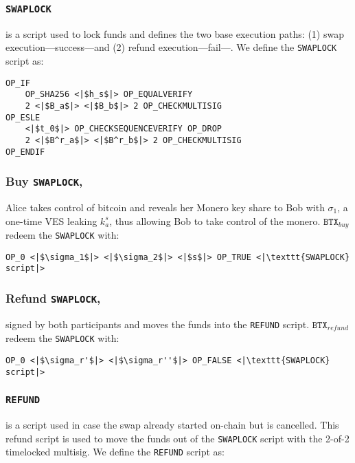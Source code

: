 \documentclass{llncs}
\newcommand{\BTX}{\texttt{BTX}}
\begin{document}
\subsubsection{\texttt{SWAPLOCK}}
is a script used to lock funds and defines the two base execution paths: (1) swap execution---success---and (2) refund execution---fail---. We define the \texttt{SWAPLOCK} script as:

\begin{verbatim}
OP_IF
    OP_SHA256 <|$h_s$|> OP_EQUALVERIFY
    2 <|$B_a$|> <|$B_b$|> 2 OP_CHECKMULTISIG
OP_ESLE
    <|$t_0$|> OP_CHECKSEQUENCEVERIFY OP_DROP
    2 <|$B^r_a$|> <|$B^r_b$|> 2 OP_CHECKMULTISIG
OP_ENDIF
\end{verbatim}

\subsubsection{Buy \texttt{SWAPLOCK},}
Alice takes control of bitcoin and reveals her Monero key share to Bob with $\sigma_1$, a one-time VES leaking $k^s_a$, thus allowing Bob to take control of the monero. $\BTX_\textit{buy}$ redeem the \texttt{SWAPLOCK} with:

\begin{verbatim}
OP_0 <|$\sigma_1$|> <|$\sigma_2$|> <|$s$|> OP_TRUE <|\texttt{SWAPLOCK} script|>
\end{verbatim}

\subsubsection{Refund \texttt{SWAPLOCK},}
signed by both participants and moves the funds into the \texttt{REFUND} script. $\BTX_\textit{refund}$ redeem the \texttt{SWAPLOCK} with:

\begin{verbatim}
OP_0 <|$\sigma_r'$|> <|$\sigma_r''$|> OP_FALSE <|\texttt{SWAPLOCK} script|>
\end{verbatim}

\subsubsection{\texttt{REFUND}}
is a script used in case the swap already started on-chain but is cancelled. This refund script is used to move the funds out of the \texttt{SWAPLOCK} script with the 2-of-2 timelocked multisig. We define the \texttt{REFUND} script as:
\end{document}
